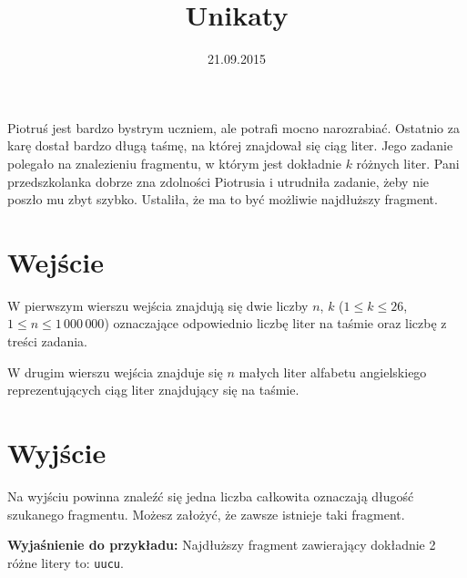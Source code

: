 \documentclass[zad,zawodnik,utf8]{sinol}
\title{Unikaty}
\author{} %
\date{21.09.2015}
\begin{document}
\begin{tasktext}%
Piotruś jest bardzo bystrym uczniem, ale potrafi mocno narozrabiać. Ostatnio za karę dostał bardzo długą taśmę, na której znajdował się ciąg liter. Jego zadanie polegało na znalezieniu fragmentu, w którym jest dokładnie $k$ różnych liter. Pani przedszkolanka dobrze zna zdolności Piotrusia i utrudniła zadanie, żeby nie poszło mu zbyt szybko. Ustaliła, że ma to być możliwie najdłuższy fragment.

\section{Wejście}
W pierwszym wierszu wejścia znajdują się dwie liczby $n$, $k$ ($1 \leq k \leq 26$, $1 \leq n \leq 1\,000\,000$) oznaczające odpowiednio liczbę liter na taśmie oraz liczbę z treści zadania.

W drugim wierszu wejścia znajduje się $n$ małych liter alfabetu angielskiego reprezentujących ciąg liter znajdujący się na taśmie.

\section{Wyjście}
Na wyjściu powinna znaleźć się jedna liczba całkowita oznaczają długość szukanego fragmentu.
Możesz założyć, że zawsze istnieje taki fragment.

\makecompactexample
  \medskip
  \noindent
  \textbf{Wyjaśnienie do przykładu:} 
  Najdłuższy fragment zawierający dokładnie 2 różne litery to: \texttt{uucu}.

\end{tasktext}
\end{document}
